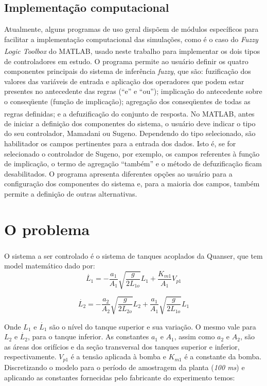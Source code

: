 \documentclass[
	twoside,				%
	twocolumn,				%
	english,				%
	brazil,					%
]{article}
\begin{document}
\subsection{Implementação computacional}

Atualmente, alguns programas de uso geral dispõem de módulos específicos para facilitar a implementação computacional das simulações, como é o caso do \textit{Fuzzy Logic Toolbox} do MATLAB\textsuperscript{\textregistered}, usado neste trabalho para implementar os dois tipos de controladores em estudo. O programa permite ao usuário definir os quatro componentes principais do sistema de inferência \textit{fuzzy}, que são: fuzificação dos valores das variáveis de entrada e aplicação dos operadores que podem estar presentes no antecedente das regras (“e” e “ou”); implicação do antecedente sobre o conseqüente (função de implicação); agregação dos conseqüentes de todas as regras definidas; e a defuzificação do conjunto de resposta. No MATLAB\textsuperscript{\textregistered}, antes de iniciar a definição dos componentes do sistema, o usuário deve indicar o tipo do seu controlador, Mamadani ou Sugeno. Dependendo do tipo selecionado, são habilitador os campos pertinentes para a entrada dos dados. Isto é, se for selecionado o controlador de Sugeno, por exemplo, os campos referentes à função de implicação, o termo de agregação “também” e o método de defuzificação ficam desabilitados. O programa apresenta diferentes opções ao usuário para a configuração dos componentes do sistema e, para a maioria dos campos, também permite a definição de outras alternativas.

\section{O problema}\label{problema}

O sistema a ser controlado é o sistema de tanques acoplados da Quanser\textsuperscript{\textregistered}, que tem model matemático dado por:
\begin{equation}
\label{eq:dL1}
\dot{L_{1}} = - \frac{a_{1}}{A_{1}} \sqrt{\frac{g}{2L_{1o}}}L_{1}+\frac{K_{m1}}{A_{1}}V_{p1}
\end{equation}

\begin{equation}
\label{eq:dL2}
\dot{L_{2}} = - \frac{a_{2}}{A_{2}} \sqrt{\frac{g}{2L_{2o}}}L_{2}+\frac{a_{1}}{A_{1}} \sqrt{\frac{g}{2L_{1o}}}L_{1}
\end{equation}

Onde $L_{1}$ e $\dot{L_{1}}$ são o nível do tanque superior e sua variação. O mesmo vale para $L_{2}$ e $\dot{L_{2}}$, para o tanque inferior. As constantes $a_{1}$ e $A_{1}$, assim como $a_{2}$ e $A_{2}$, são as áreas dos orifícios e da seção transversal dos tanques superior e inferior, respectivamente. $V_{p1}$ é a tensão aplicada à bomba e $K_{m1}$ é a constante da bomba. Discretizando o modelo para o período de amostragem da planta (\textit{100 ms}) e aplicando as constantes fornecidas pelo fabricante do experimento temos:
\end{document}
